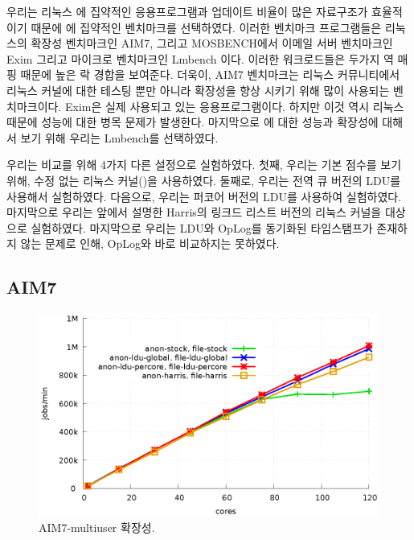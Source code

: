 
우리는 리눅스 에 집약적인 응용프로그램과 업데이트 비율이 많은 자료구조가 
효율적이기 때문에 에 집약적인 벤치마크를 선택하였다. 
이러한 벤치마크 프로그램들은 리눅스의 확장성 벤치마크인 AIM7, 그리고 MOSBENCH에서 
이메일 서버 벤치마크인 Exim 그리고 마이크로 벤치마크인 Lmbench 이다.
이러한 워크로드들은 두가지 역 매핑 때문에 높은 락 경합을 보여준다. 
더욱이, AIM7 벤치마크는 리눅스 커뮤니티에서 리눅스 커널에 대한 테스팅 뿐만 아니라 확장성을 향상 
시키기 위해 많이 사용되는 벤치마크이다.
Exim은 실제 사용되고 있는 응용프로그램이다. 
하지만 이것 역시 리눅스  때문에 성능에 대한 병목 문제가 발생한다.
마지막으로 에 대한 성능과 확장성에 대해서 보기 위해 우리는 Lmbench를 선택하였다. 

우리는 비교를 위해 4가지 다른 설정으로 실험하였다. 
첫째, 우리는 기본 점수를 보기 위해, 수정 없는 리눅스 커널()을 사용하였다.
둘째로, 우리는 전역 큐 버전의 LDU를 사용해서 실험하였다.  
다음으로, 우리는 퍼코어 버전의 LDU를 사용하여 실험하였다. 
마지막으로 우리는 앞에서 설명한 Harris의  링크드 리스트 버전의 리눅스 커널을 대상으로 
실험하였다.  
마지막으로 우리는 LDU와 OpLog를 동기화된 타임스탬프가 존재하지 않는 문제로 인해,
OpLog와 바로 비교하지는 못하였다.

\subsection{AIM7}

\begin{figure}[tb]
  \begin{center}
    \includegraphics[scale=1]{graph/aim7.eps}
  \end{center}
  \caption{AIM7-multiuser 확장성.}
  \label{fig:aim7}
\end{figure}

